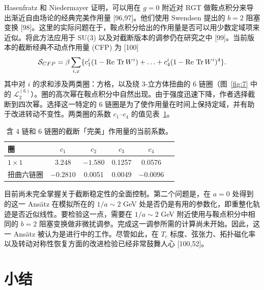 Hasenfratz 和 Niedermayer 证明，可以用在 $g = 0$ 附近对 RGT 做鞍点积分来导出渐近自由场论的经典完美作用量 [96,97]。他们使用 Swendsen 提出的 $b = 2$ 阻塞变换 [98]。这里的实际问题在于，鞍点积分给出的作用量是否可以用少数定域项来近似。将此方法应用于 SU(3) 以及对截断版本的调参仍在研究之中 [99]。当前版本的截断经典不动点作用量 (CFP) 为 [100]
\begin{equation}
\mathcal{S}_{CFP} = \beta\sum_{i,x}\{c_1^i(1 - \mathrm{Re}\,\Tr W^i)
    + \ldots + c_4^i(1 - \mathrm{Re}\,\Tr W^i)^4\}.
\label{eq:Perfectaction}
\end{equation}
其中对 $i$ 的求和涉及两类圈：方格，以及绕 3-立方体扭曲的 6 链圈（图~\ref{fig:7} 中的 $\mathcal{L}_2^{(6)}$）。圈的高次幂在鞍点积分中自然出现。由于强度迅速下降，作者选择截断到四次幂。选择这一特定的 6 链圈是为了使作用量在时间上保持定域，并有助于改进转动不变性。两类圈的系数 $c_1$--$c_4$ 的值见表~\ref{tab:5}。

\begin{table}[htbp]
\centering
\begin{tabular}{lccccc}
\toprule
圈 & $c_1$ & $c_2$ & $c_3$ & $c_4$\\
\midrule
$1\times1$        & 3.248   & $-1.580$ & 0.1257  & 0.0576\\
扭曲六链圈    & $-0.2810$ & 0.0051 & 0.0049  & $-0.0096$\\
\bottomrule
\end{tabular}
\caption{含 4 链和 6 链圈的截断「完美」作用量的当前系数。}
\label{tab:5}
\end{table}

目前尚未完全掌握关于截断稳定性的全面控制。第二个问题是，在 $a = 0$ 处得到的这一 Ans\"atz 在模拟所在的 $1/a \sim 2$ GeV 处是否仍是有用的参数化，即重整化轨迹是否近似线性。要检验这一点，需要在 $1/a \sim 2$ GeV 附近使用与鞍点积分中相同的 $b = 2$ 阻塞变换做非微扰调参。完成这一调参所需的计算尚未开始。因此，这一 Ans\"atz 被认为是进行中的工作。尽管如此，在 $T_c$ 标度、弦张力、拓扑磁化率以及转动对称性恢复方面的改进检验已经非常鼓舞人心 [100,52]。

\section{小结}

